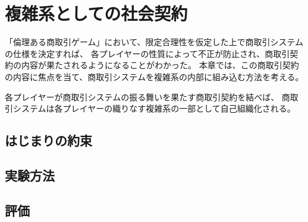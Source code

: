 \chapter{複雑系としての社会契約}
「倫理ある商取引ゲーム」において、限定合理性を仮定した上で商取引システムの仕様を決定すれば、
各プレイヤーの性質によって不正が防止され、商取引契約の内容が果たされるようになることがわかった。
本章では、この商取引契約の内容に焦点を当て、商取引システムを複雑系の内部に組み込む方法を考える。

各プレイヤーが商取引システムの振る舞いを果たす商取引契約を結べば、
商取引システムは各プレイヤーの織りなす複雑系の一部として自己組織化される。

\section{はじまりの約束}

\section{実験方法}

\section{評価}
